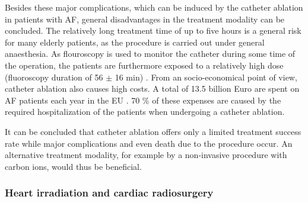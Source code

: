 \documentclass[type=dr, dr=rernat, accentcolor=tud7b,colorbacktitle, bigchapter, openright, twoside, 12pt ]{tudthesis}
\begin{document}
Besides these major complications, which can be induced by the catheter ablation in patients with AF, general disadvantages in the 
treatment modality can be concluded. The relatively long treatment time of up to five hours \cite{Jong05} is a general risk for many 
elderly patients, as the procedure is carried out under general anaesthesia. As flouroscopy is used to monitor the catheter during some time 
of the operation, the patients are furthermore exposed to a relatively high dose (fluoroscopy duration of 56 $\pm$ 16 min) \cite{Ber10}. 
From an socio-economical point of view, catheter ablation also causes high costs. A total of 13.5 billion Euro are spent on AF 
patients each year in the EU \cite{Fus06}. 70 \% of these expenses are caused by the required hospitalization of the patients when undergoing 
a catheter ablation. \newline

It can be concluded that catheter ablation offers only a limited treatment success rate while major complications and even death due to the 
procedure occur. An alternative treatment modality, for example by a non-invasive procedure with carbon ions, would thus be beneficial.  


% 
% 


\subsubsection*{Heart irradiation and cardiac radiosurgery}
\label{cardiacradiosurgery}
\end{document}
